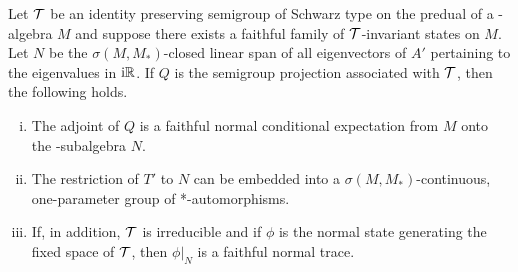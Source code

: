 \begin{theorem}\label{thm:d4-3.5}
Let $\mathcal{T}$ be an identity preserving semigroup of Schwarz type on the predual of a \WA-algebra $M$ and suppose there exists a faithful family of\/ $\mathcal{T}$-invariant states on $M$.
Let $N$ be the $\sigma(M,M_{*})$-closed linear span of all eigenvectors of $A'$ pertaining to the eigenvalues in $\mathrm{i}\mathbb{R}$.
If $Q$ is the semigroup projection associated with $\mathcal{T}$, then the following holds.
\begin{enumerate}[(i)]
\item 
The adjoint of $Q$ is a faithful normal conditional expectation from $M$ onto the \WA-subalgebra $N$.

\item 
The restriction of $T'$ to $N$ can be embedded into a $\sigma(M,M_{*})$-continuous, one-parameter group of *-automorphisms.

\item 
If, in addition, $\mathcal{T}$ is irreducible and if $\phi$ is the normal state generating the fixed space of\/ $\mathcal{T}$, then $\phi|_{N}$ is a faithful normal trace.

\end{enumerate}
\end{theorem}
